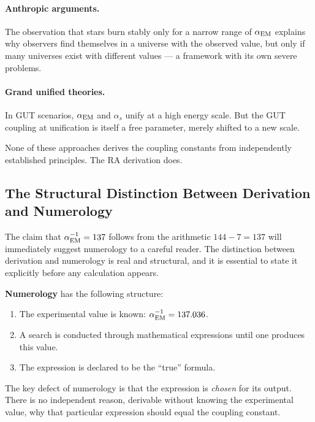 \documentclass[12pt,a4paper]{article}
\begin{document}
\paragraph{Anthropic arguments.}  The observation that stars burn stably only for a narrow range of $\alpha_{\rm EM}$ \cite{Barrow1988} explains why observers find themselves in a universe with the observed value, but only if many universes exist with different values --- a framework with its own severe problems.

\paragraph{Grand unified theories.}  In GUT scenarios, $\alpha_{\rm EM}$ and $\alpha_s$ unify at a high energy scale.  But the GUT coupling at unification is itself a free parameter, merely shifted to a new scale.

None of these approaches derives the coupling constants from independently established principles.  The RA derivation does.

\subsection{The Structural Distinction Between Derivation and Numerology}\label{sec:notnumerology}

The claim that $\alpha_{\rm EM}^{-1}=137$ follows from the arithmetic $144-7=137$ will immediately suggest numerology to a careful reader.  The distinction between derivation and numerology is real and structural, and it is essential to state it explicitly before any calculation appears.

\textbf{Numerology} has the following structure:
\begin{enumerate}
  \item The experimental value is known: $\alpha_{\rm EM}^{-1}=137.036$.
  \item A search is conducted through mathematical expressions until one produces this value.
  \item The expression is declared to be the ``true'' formula.
\end{enumerate}
The key defect of numerology is that the expression is \emph{chosen} for its output.  There is no independent reason, derivable without knowing the experimental value, why that particular expression should equal the coupling constant.
\end{document}
